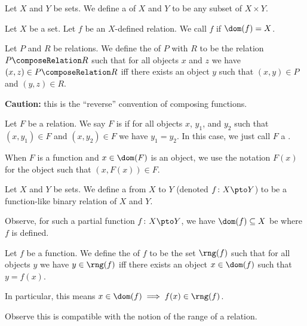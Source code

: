 \begin{definition}
Let $X$ and $Y$ be sets. We define a  of $X$
and $Y$ to be any subset of $X\times Y$.
\end{definition}

\begin{definition}
Let $X$ be a set. Let $f$ be an $X$-defined relation.
We call $f$  if $\dom(f)=X$.
\end{definition}

\begin{definition}
Let $P$ and $R$ be relations. We define the  of
$P$ with $R$ to be the relation $P\composeRelation R$ such that
for all objects $x$ and $z$ we have $(x,z)\in P\composeRelation R$
iff there exists an object $y$ such that $(x,y)\in P$ and $(y,z)\in R$.

\textbf{Caution:} this is the ``reverse'' convention of composing functions.
\end{definition}

\begin{definition}
Let $F$ be a relation. We say $F$ is  if for all
objects $x$, $y_{1}$, and $y_{2}$ such that $(x,y_{1})\in F$ and
$(x,y_{2})\in F$ we have $y_{1}=y_{2}$. In this case, we just call $F$
a .

When $F$ is a function and $x\in\dom(F)$ is an object, we use the
notation $F(x)$ for the object such that $(x, F(x))\in F$.
\end{definition}

\begin{definition}
Let $X$ and $Y$ be sets. We define a  from
$X$ to $Y$ (denoted $f\colon X\pto Y$) to be a function-like binary relation
of $X$ and $Y$.

Observe, for such a partial function $f\colon X\pto Y$, we have
$\dom(f)\subset X$ be where $f$ is defined.
\end{definition}

\begin{definition}
Let $f$ be a function. We define the  of $f$ to be the
set $\rng(f)$ such that for all objects $y$ we have $y\in\rng(f)$ iff
there exists an object $x\in\dom(f)$ such that $y=f(x)$.

In particular, this means $x\in\dom(f)\implies f(x)\in\rng(f)$.

Observe this is compatible with the notion of the range of a relation.
\end{definition}

